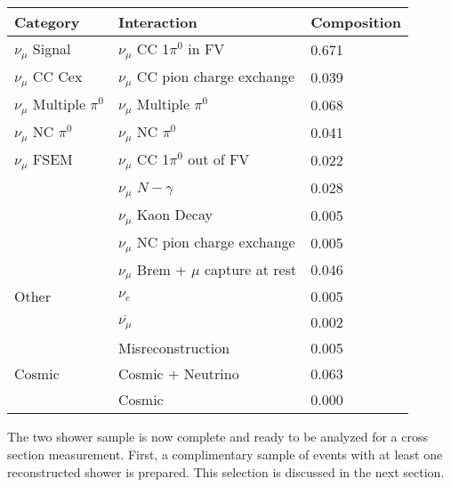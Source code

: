 \begin{table}[H]
\centering
{}
 \begin{tabular}{|l|l|l|}
 \hline
Category & Interaction & Composition \\ [0.1ex] \hline
$\nu_\mu$ Signal & $\nu_\mu$ CC 1$\pi^0$ in FV & 0.671 \\ \hline
$\nu_\mu$ CC Cex & $\nu_\mu$ CC pion charge exchange & 0.039 \\ \hline
$\nu_\mu$ Multiple $\pi^0$ & $\nu_\mu$ Multiple $\pi^0$ & 0.068 \\ \hline
$\nu_\mu$ NC $\pi^0$ & $\nu_\mu$ NC $\pi^0$ & 0.041 \\ \hline
$\nu_\mu$ FSEM & $\nu_\mu$ CC 1$\pi^0$ out of FV & 0.022 \\
& $\nu_\mu$ $N-\gamma$ & 0.028 \\
& $\nu_\mu$ Kaon Decay & 0.005 \\
& $\nu_\mu$ NC pion charge exchange & 0.005 \\ 
&$\nu_\mu$ Brem + $\mu$ capture at rest & 0.046 \\ \hline
Other & $\nu_e$ &0.005 \\
&$\overline{\nu_\mu}$ & 0.002 \\
& Misreconstruction & 0.005 \\ \hline
Cosmic & Cosmic + Neutrino& 0.063 \\
& Cosmic & 0.000 \\ \hline
\end{tabular}
\end{table}

\par The two shower sample is now complete and ready to be analyzed for a cross section measurement. First, a complimentary sample of events with at least one reconstructed shower is prepared. This selection is discussed in the next section.


\clearpage
